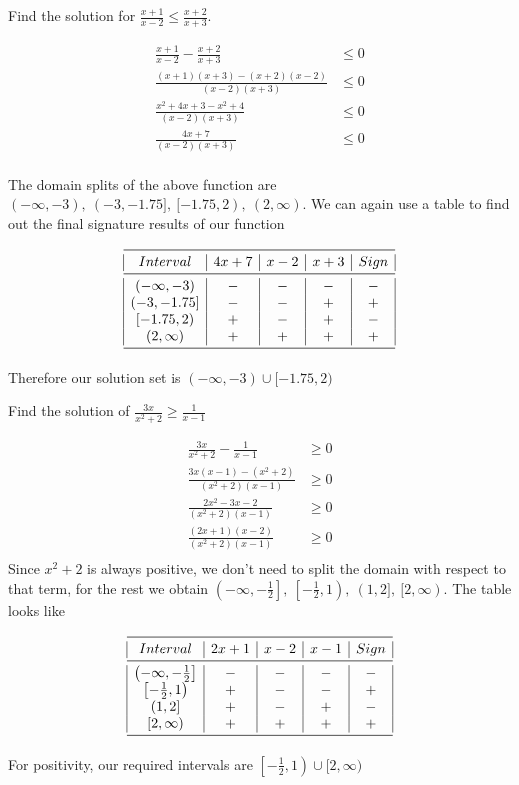 \documentclass[a4paper]{article}
\begin{document}
\begin{question}
Find the solution for \(\frac{x+1}{x-2} \leq \frac{x+2}{x+3}\).
\end{question}
\begin{align*}
\frac{x+1}{x-2} - \frac{x+2}{x+3} &\leq 0 \\
\frac{(x+1)(x+3) - (x+2)(x-2)}{(x-2)(x+3)} &\leq 0 \\
\frac{x^2 +4x + 3 - x^2 + 4}{(x-2)(x+3)} &\leq 0 \\
\frac{4x + 7}{(x-2)(x+3)} &\leq 0 \\
\end{align*}

The domain splits of the above function are \((-\infty, -3),\ (-3, -1.75],\ [-1.75, 2),\ (2, \infty)\). We can again use a table to find out the final signature results of our function

\[
\begin{array}{|c|c|c|c|c|}
\midrule
Interval & 4x+7 & x-2 & x+3 & Sign \\
\midrule
(-\infty, -3) & - & - & - & - \\
\left(-3, -1.75\right] & - & - & + & + \\
\left[-1.75, 2\right) & + & - & + & - \\
(2, \infty) & + & + & + & + \\
\midrule
\end{array}
\]

Therefore our solution set is \((-\infty, -3) \cup [-1.75, 2)\)

\begin{question}
Find the solution of \(\frac{3x}{x^2+2} \geq \frac{1}{x-1}\)
\end{question}
\begin{align*}
\frac{3x}{x^2+2} - \frac{1}{x-1} &\geq 0 \\
\frac{3x(x-1) - (x^2+2)}{(x^2+2)(x-1)} &\geq 0 \\
\frac{2x^2 -3x -2}{(x^2+2)(x-1)} &\geq 0 \\
\frac{(2x+1)(x-2)}{(x^2+2)(x-1)} &\geq 0 \\
\end{align*}
Since \(x^2+2\) is always positive, we don't need to split the domain with respect to that term, for the rest we obtain \(\left(-\infty, -\frac{1}{2}\right],\ \left[-\frac{1}{2}, 1\right),\ (1, 2],\ [2, \infty)\). The table looks like

\[
\begin{array}{|c|c|c|c|c|}
\midrule
Interval & 2x+1 & x-2 & x-1 & Sign \\
\midrule
\left(-\infty, -\frac{1}{2}\right] & - & - & - & - \\
\left[-\frac{1}{2}, 1\right) & + & - & - & + \\
\left(1, 2\right] & + & - & + & - \\
\left[2, \infty\right) & + & + & + & + \\
\midrule
\end{array}
\]

For positivity, our required intervals are \(\left[-\frac{1}{2}, 1\right) \cup [2, \infty)\)
\end{document}
